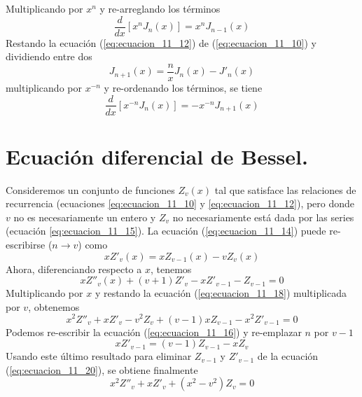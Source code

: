 Multiplicando por $x^{n}$ y re-arreglando los términos
\begin{equation}
\dfrac{d}{dx} \left[ x^{n} J_{n} (x) \right] = x^{n} J_{n-1}(x)
\label{eq:ecuacion_11_15}
\end{equation}
Restando la ecuación (\ref{eq:ecuacion_11_12}) de (\ref{eq:ecuacion_11_10}) y dividiendo entre dos
\begin{equation}
J_{n+1}(x) = \dfrac{n}{x} J_{n}(x) - J'_{n}(x)
\label{eq:ecuacion_11_16}
\end{equation}
multiplicando por $x^{-n}$ y re-ordenando los términos, se tiene
\begin{equation}
\dfrac{d}{dx} \left[ x^{-n} J_{n} (x) \right] = -x^{-n} J_{n+1}(x)
\label{eq:ecuacion_11_17}
\end{equation}
\section{Ecuación diferencial de Bessel.}
Consideremos un conjunto de funciones $Z_{v}(x)$ tal que satisface las relaciones de recurrencia (ecuaciones \ref{eq:ecuacion_11_10} y \ref{eq:ecuacion_11_12}), pero donde $v$ no es necesariamente un entero y $Z_{v}$ no necesariamente está dada por las series (ecuación \ref{eq:ecuacion_11_15}). La ecuación (\ref{eq:ecuacion_11_14}) puede re-escribirse ($n \to v$) como
\begin{equation}
x Z'_{v} (x) = x Z_{v-1}(x) - v Z_{v} (x)
\label{eq:ecuacion_11_18}
\end{equation}
Ahora, diferenciando respecto a $x$, tenemos
\begin{equation}
x Z''_{v}(x) +  (v+1) Z'_{v} - x Z'_{v-1} - Z_{v-1} = 0
\label{eq:ecuacion_11_19}
\end{equation}
Multiplicando por $x$ y restando la ecuación (\ref{eq:ecuacion_11_18}) multiplicada por $v$, obtenemos
\begin{equation}
x^{2} Z''_{v} + x Z'_{v} - v^{2} Z_{v} + (v-1) x Z_{v-1} - x^{2} Z'_{v-1} = 0
\label{eq:ecuacion_11_20}
\end{equation}
Podemos re-escribir la ecuación (\ref{eq:ecuacion_11_16}) y re-emplazar $n$ por $v-1$
\begin{equation}
x Z'_{v-1} = (v-1) Z_{v-1} - x Z_{v}
\label{eq:ecuacion_11_21}
\end{equation}
Usando este último resultado para eliminar $Z_{v-1}$ y $Z'_{v-1}$ de la ecuación (\ref{eq:ecuacion_11_20}), se obtiene finalmente
\begin{equation}
x^{2} Z''_{v} + x Z'_{v} + (x^{2} - v^{2}) Z_{v} = 0
\label{eq:ecuacion_11_22}
\end{equation}
